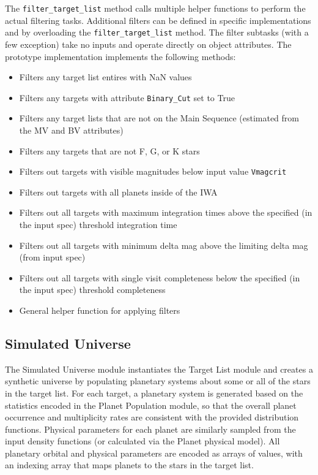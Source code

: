 \documentclass[cleanfoot]{asme2ej}
\begin{document}
The \verb+filter_target_list+ method calls multiple helper functions to perform the actual filtering tasks.  Additional filters can be defined in specific implementations and by overloading the  \verb+filter_target_list+ method.  The filter subtasks (with a few exception) take no inputs and operate directly on object attributes. The prototype implementation implements the following methods:
\begin{itemize}[leftmargin=2in,font={\ttfamily}]
    \item[\texttt nan\_filter] Filters any target list entires with NaN values
    \item[\texttt binary\_filter] Filters any targets with attribute \verb+Binary_Cut+ set to True
    \item[\texttt main\_sequence\_filter] Filters any target lists that are not on the Main Sequence (estimated from the MV and BV attributes)
    \item[\texttt fgk\_filter] Filters any targets that are not F, G, or K stars
    \item[\texttt vis\_mag\_filter] Filters out targets with visible magnitudes below input value \verb+Vmagcrit+
    \item[\texttt outside\_IWA\_filter] Filters out targets with all planets inside of the IWA
    \item[\texttt int\_cutoff\_filter] Filters out all targets with maximum integration times above the specified (in the input spec) threshold integration time
    \item[\texttt max\_dmag\_filter] Filters out all targets with minimum delta mag above the limiting delta mag (from input spec)
    \item[\texttt completeness\_filter] Filters out all targets with single visit completeness below the specified (in the input spec) threshold completeness
    \item[\texttt revise\_lists] General helper function for applying filters
\end{itemize}



\subsection{Simulated Universe} \label{sec:simulateduniverse}
The Simulated Universe module instantiates the Target List module and creates a synthetic universe by populating planetary systems about some or all of the stars in the target list.  For each target, a planetary system is generated based on the statistics encoded in the Planet Population module, so that the overall planet occurrence and multiplicity rates are consistent with the provided distribution functions.  Physical parameters for each planet are similarly sampled from the input density functions (or calculated via the Planet physical model).  All planetary orbital and physical parameters are encoded as arrays of values, with an indexing array that maps planets to the stars in the target list. 
\end{document}
